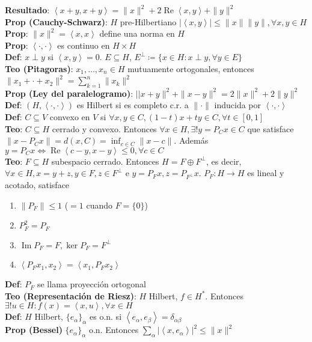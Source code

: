 \documentclass[9pt, letterpaper]{extarticle}
\newcommand{\inn}[1]{\left\langle #1\right\rangle}
\begin{document}
\begin{multicols*}{2}
\textbf{Resultado}: $\inn{x+y,x+y}=\|x\|^2+2\operatorname{Re}\inn{x,y}+\|y\|^2$\\
\textbf{\color{red}Prop (Cauchy-Schwarz)}: $H$ pre-Hilbertiano $|\inn{x,y}|\leq \|x\|\|y\|,\forall x,y\in H$\\
\textbf{Prop}: $\|x\|^2=\inn{x,x}$ define una norma en $H$\\
\textbf{Prop}: $\inn{\cdot,\cdot}$ es continuo en $H\times H$\\
\textbf{Def}: $x\perp y$ si $\inn{x,y}=0$. $E\subseteq H$, $E^\perp\coloneqq \{x\in H:x\perp y,\forall y\in E\}$\\
\textbf{Teo (Pitagoras)}: $x_1,\ldots,x_n\in H$ mutuamente ortogonales, entonces $\|x_1+\cdot+x_2\|^2=\sum_{k=1}^n \|x_k\|^2$\\
\textbf{Prop (Ley del paralelogramo)}: $||x+y\|^2+\|x-y\|^2=2\|x\|^2+2\|y\|^2$\\
\textbf{Def}: $(H,\inn{\cdot,\cdot})$ es Hilbert si es completo c.r. a $\|\cdot\|$ inducida por $\inn{\cdot,\cdot}$\\
\textbf{Def}: $C\subseteq V$ convexo en $V$ si $\forall x,y\in C,(1-t)x+ty\in C,\forall t\in [0,1]$\\
\textbf{Teo}: $C\subseteq H$ cerrado y convexo. Entonces $\forall x\in H,\exists!y=P_Cx\in C$ que satisface $\|x-P_Cx\|=d(x,C)=\inf_{c\in C}\|x-c\|$. Además $y=P_C x\iff \operatorname{Re}\inn{c-y,x-y}\leq 0,\forall c\in C$\\
\textbf{\color{red}Teo}: $F\subseteq H$ subespacio cerrado. Entonces $H=F\oplus F^\perp$, es decir, $\forall x\in H, x=y+z,y\in F,z\in F^\perp$ e $y=P_Fx,z=P_{F^\perp}x$. $P_F:H\to H$ es lineal y acotado, satisface
\begin{enumerate}
	\item $\|P_F\|\leq 1$ ($=1$ cuando $F=\{0\}$)
	\item $P_F^2=P_F$
	\item $\operatorname{Im} P_F=F,\ker P_F=F^\perp$
	\item $\inn{P_Fx_1,x_2}=\inn{x_1,P_F x_2}$
\end{enumerate}
\textbf{Def}: $P_F$ se llama proyección ortogonal\\
\textbf{\color{red}Teo (Representación de Riesz)}: $H$ Hilbert, $f\in H^*$. Entonces $\exists!u\in H:f(x)=\inn{x,u},\forall x\in H$\\
\textbf{Def}: $H$ Hilbert, $\{e_\alpha\}_\alpha$ es o.n. si $\inn{e_\alpha,e_\beta}=\delta_{\alpha\beta}$\\
\textbf{Prop (Bessel)} $\{e_\alpha\}_\alpha$ o.n. Entonces $\sum_\alpha |\inn{x,e_\alpha}|^2\leq \|x\|^2$\\

\end{multicols*}
\end{document}
